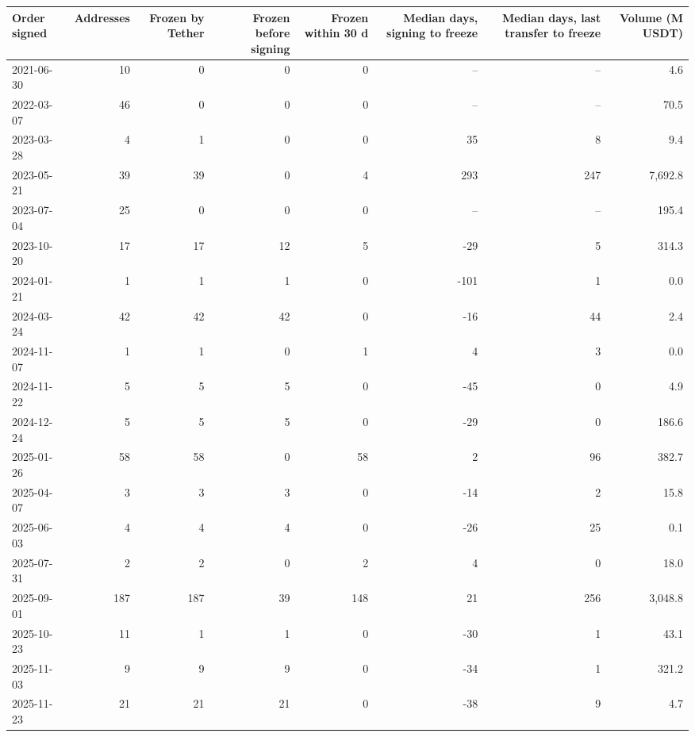 \begin{tabular}{lrrrrrrr}
\toprule
\textbf{Order signed} & \textbf{Addresses} & \textbf{Frozen by Tether} & \textbf{Frozen before signing} & \textbf{Frozen within 30 d} & \textbf{Median days, signing to freeze} & \textbf{Median days, last transfer to freeze} & \textbf{Volume (M USDT)} \\
\midrule
2021-06-30 & 10 & 0 & 0 & 0 & -- & -- & 4.6 \\
2022-03-07 & 46 & 0 & 0 & 0 & -- & -- & 70.5 \\
2023-03-28 & 4 & 1 & 0 & 0 & 35 & 8 & 9.4 \\
2023-05-21 & 39 & 39 & 0 & 4 & 293 & 247 & 7,692.8 \\
2023-07-04 & 25 & 0 & 0 & 0 & -- & -- & 195.4 \\
2023-10-20 & 17 & 17 & 12 & 5 & -29 & 5 & 314.3 \\
2024-01-21 & 1 & 1 & 1 & 0 & -101 & 1 & 0.0 \\
2024-03-24 & 42 & 42 & 42 & 0 & -16 & 44 & 2.4 \\
2024-11-07 & 1 & 1 & 0 & 1 & 4 & 3 & 0.0 \\
2024-11-22 & 5 & 5 & 5 & 0 & -45 & 0 & 4.9 \\
2024-12-24 & 5 & 5 & 5 & 0 & -29 & 0 & 186.6 \\
2025-01-26 & 58 & 58 & 0 & 58 & 2 & 96 & 382.7 \\
2025-04-07 & 3 & 3 & 3 & 0 & -14 & 2 & 15.8 \\
2025-06-03 & 4 & 4 & 4 & 0 & -26 & 25 & 0.1 \\
2025-07-31 & 2 & 2 & 0 & 2 & 4 & 0 & 18.0 \\
2025-09-01 & 187 & 187 & 39 & 148 & 21 & 256 & 3,048.8 \\
2025-10-23 & 11 & 1 & 1 & 0 & -30 & 1 & 43.1 \\
2025-11-03 & 9 & 9 & 9 & 0 & -34 & 1 & 321.2 \\
2025-11-23 & 21 & 21 & 21 & 0 & -38 & 9 & 4.7 \\
\bottomrule
\end{tabular}
